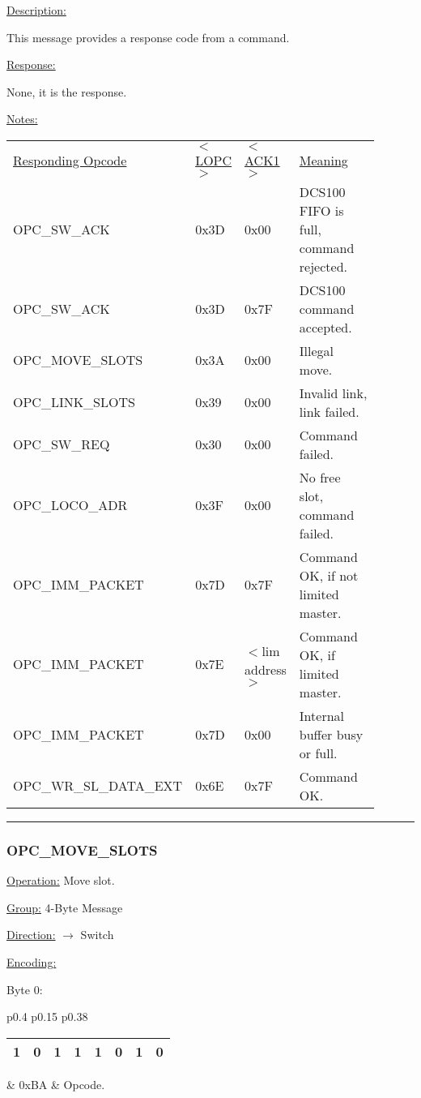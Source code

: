 \underline{Description:}

This message provides a response code from a command.

\underline{Response:} 

None, it is the response.

\underline{Notes:} 

\begin{tabular}{p{0.3\linewidth} p{0.10\linewidth} p{0.10\linewidth} p{0.40\linewidth}}
\underline{Responding Opcode} & \underline{$<$LOPC$>$} & \underline{$<$ACK1$>$} & \underline{Meaning}\\
OPC\_SW\_ACK & 0x3D & 0x00 & DCS100 FIFO is full, command rejected.\\
OPC\_SW\_ACK & 0x3D & 0x7F &  DCS100 command accepted.\\
OPC\_MOVE\_SLOTS & 0x3A & 0x00 & Illegal move.\\
OPC\_LINK\_SLOTS & 0x39 & 0x00 & Invalid link, link failed.\\
OPC\_SW\_REQ & 0x30 & 0x00 & Command failed.\\
OPC\_LOCO\_ADR & 0x3F & 0x00 & No free slot, command failed.\\
OPC\_IMM\_PACKET & 0x7D & 0x7F & Command OK, if not limited master.\\
OPC\_IMM\_PACKET & 0x7E & $<$lim address$>$ & Command OK, if limited master.\\
OPC\_IMM\_PACKET & 0x7D & 0x00 & Internal buffer busy or full.\\
OPC\_WR\_SL\_DATA\_EXT & 0x6E & 0x7F & Command OK.\\
\end{tabular}

\rule{15.1cm}{0.4pt}
\subsubsection{OPC\_MOVE\_SLOTS}
\underline{Operation:} Move slot.

\underline{Group:} \hspace{0.5cm} 4-Byte Message

\underline{Direction:} \hspace{0.05cm} $\rightarrow$ Switch

\underline{Encoding:} 

Byte 0:

\begin{tabular}{p{0.4\linewidth} p{0.15\linewidth} p{0.38\linewidth}} 

\begin{tabular}{|p{0.3cm}|p{0.3cm}|p{0.3cm}|p{0.3cm}|p{0.3cm}|p{0.3cm}|p{0.3cm}|p{0.3cm}|}
\hline
1 & 0 & 1 & 1 & 1 & 0 & 1 & 0\\
\hline
\end{tabular}
& 0xBA & Opcode.\\
\end{tabular}

